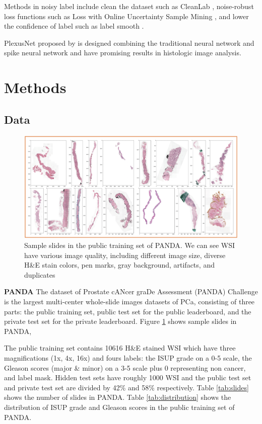 \documentclass{article}
\begin{document}
Methods in noisy label include clean the dataset such as CleanLab \citep{northcutt2019confident}, noise-robust loss functions such as Loss with Online Uncertainty Sample Mining \citep{xue2019robust}, and lower the confidence of label such as label smooth \citep{muller2019does}. 

PlexusNet proposed by \citep{eminaga2019plexus} is designed combining the traditional neural network and spike neural network \citep{florian2007reinforcement} and have promising results in histologic image analysis.



\section{Methods}


\subsection{Data}

\begin{figure}[!htb]
\includegraphics[width=\linewidth]{PANDA.png}
\caption{Sample slides in the public training set of PANDA. We can see WSI have various image quality, including different image size, diverse H\&E stain colors, pen marks, gray background, artifacts, and duplicates}
\label{fig:panda}
\end{figure}


\textbf{PANDA} The dataset of Prostate cANcer graDe Assessment (PANDA) Challenge is the largest multi-center whole-slide images datasets of PCa, consisting of three parts: the public training set, public test set for the public leaderboard, and the private test set for the private leaderboard. Figure \ref{fig:panda} shows sample slides in PANDA,  \par

The public training set contains 10616 H\&E stained WSI which have three magnifications (1x, 4x, 16x) and fours labels: the ISUP grade on a 0-5 scale, the Gleason scores (major \& minor) on a 3-5 scale plus 0 representing non cancer, and label mask. Hidden test sets have roughly 1000 WSI \citep{pandakaggle} and the public test set and private test set are divided by 42\% and 58\% respectively. Table \ref{tab:slides} shows the number of slides in PANDA. Table \ref{tab:distribution} shows the distribution of ISUP grade and Gleason scores in the public training set of PANDA.   \par
\end{document}
